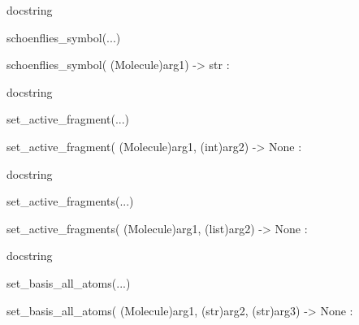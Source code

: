 \documentclass[letterpaper,10pt,english]{sphinxmanual}
\begin{document}
\begin{description}
\begin{description}
\begin{DUlineblock}{0em}
\begin{DUlineblock}{\DUlineblockindent}
\item[]
\begin{DUlineblock}{\DUlineblockindent}
\item[] docstring
\item[] 
\end{DUlineblock}
\end{DUlineblock}
\item[] schoenflies\_symbol(...)
\item[]
\begin{DUlineblock}{\DUlineblockindent}
\item[] schoenflies\_symbol( (Molecule)arg1) -\textgreater{} str :
\item[]
\begin{DUlineblock}{\DUlineblockindent}
\item[] docstring
\item[] 
\end{DUlineblock}
\end{DUlineblock}
\item[] set\_active\_fragment(...)
\item[]
\begin{DUlineblock}{\DUlineblockindent}
\item[] set\_active\_fragment( (Molecule)arg1, (int)arg2) -\textgreater{} None :
\item[]
\begin{DUlineblock}{\DUlineblockindent}
\item[] docstring
\item[] 
\end{DUlineblock}
\end{DUlineblock}
\item[] set\_active\_fragments(...)
\item[]
\begin{DUlineblock}{\DUlineblockindent}
\item[] set\_active\_fragments( (Molecule)arg1, (list)arg2) -\textgreater{} None :
\item[]
\begin{DUlineblock}{\DUlineblockindent}
\item[] docstring
\item[] 
\end{DUlineblock}
\end{DUlineblock}
\item[] set\_basis\_all\_atoms(...)
\item[]
\begin{DUlineblock}{\DUlineblockindent}
\item[] set\_basis\_all\_atoms( (Molecule)arg1, (str)arg2, (str)arg3) -\textgreater{} None :

\end{DUlineblock}
\end{DUlineblock}
\end{description}
\end{description}
\end{document}
